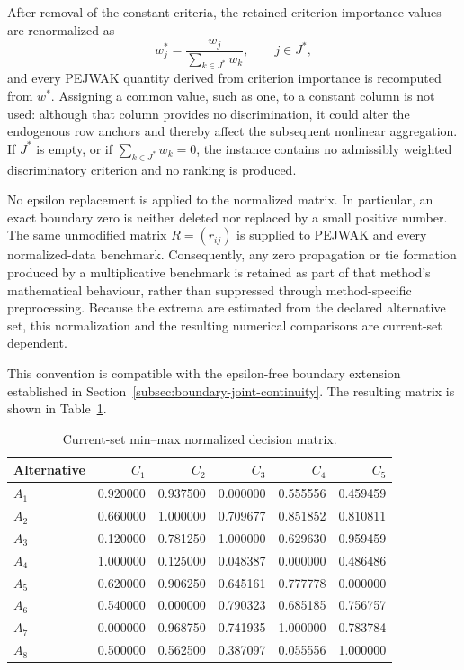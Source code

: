 \documentclass[reqno,11pt]{amsart}
\theoremstyle{definition}
\theoremstyle{plain}
\theoremstyle{remark}
\begin{document}
After removal of the constant criteria, the retained criterion-importance values are renormalized as
\begin{equation*}
w_j^\ast
=
\frac{w_j}{\sum_{k\in J^\ast}w_k},
\qquad j\in J^\ast,
\end{equation*}
and every PEJWAK quantity derived from criterion importance is
recomputed from $w^\ast$. Assigning a common value, such as one, to a
constant column is not used: although that column provides no
discrimination, it could alter the endogenous row anchors and thereby
affect the subsequent nonlinear aggregation. If $J^\ast$ is empty, or
if $\sum_{k\in J^\ast}w_k=0$, the instance contains no admissibly
weighted discriminatory criterion and no ranking is produced.

No epsilon replacement is applied to the normalized matrix. In
particular, an exact boundary zero is neither deleted nor replaced by a
small positive number. The same unmodified matrix $R=(r_{ij})$ is
supplied to PEJWAK and every normalized-data benchmark. Consequently, any
zero propagation or tie formation produced by a multiplicative
benchmark is retained as part of that method's mathematical behaviour,
rather than suppressed through method-specific preprocessing. Because
the extrema are estimated from the declared alternative set, this
normalization and the resulting numerical comparisons are
current-set dependent. 


This convention is compatible with the epsilon-free boundary extension established in Section~\ref{subsec:boundary-joint-continuity}. The resulting matrix is shown in Table~\ref{tab:normalized-matrix}.

\begin{table}[htbp]
\centering
\caption{Current-set min--max normalized decision matrix.}
\label{tab:normalized-matrix}
\begin{tabular}{lrrrrr}
\toprule
Alternative & $C_1$ & $C_2$ & $C_3$ & $C_4$ & $C_5$\\
\midrule
$A_1$&0.920000&0.937500&0.000000&0.555556&0.459459\\
$A_2$&0.660000&1.000000&0.709677&0.851852&0.810811\\
$A_3$&0.120000&0.781250&1.000000&0.629630&0.959459\\
$A_4$&1.000000&0.125000&0.048387&0.000000&0.486486\\
$A_5$&0.620000&0.906250&0.645161&0.777778&0.000000\\
$A_6$&0.540000&0.000000&0.790323&0.685185&0.756757\\
$A_7$&0.000000&0.968750&0.741935&1.000000&0.783784\\
$A_8$&0.500000&0.562500&0.387097&0.055556&1.000000\\
\bottomrule
\end{tabular}
\end{table}
\end{document}
